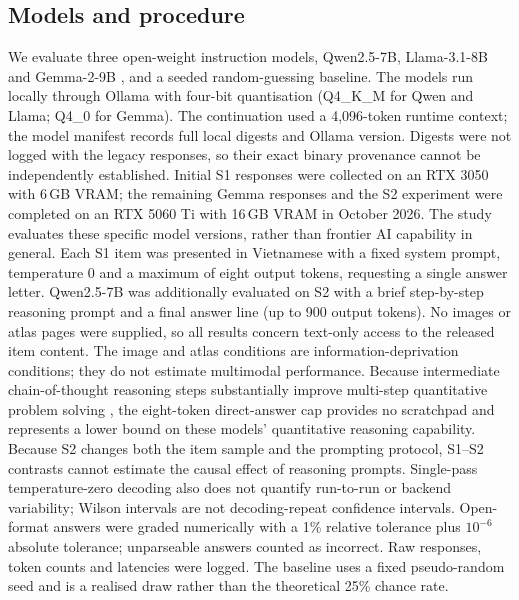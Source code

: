 \documentclass[preprint,12pt,authoryear,nonatbib]{elsarticle}
\begin{document}
\subsection{Models and procedure}
We evaluate three open-weight instruction models, Qwen2.5-7B, Llama-3.1-8B and Gemma-2-9B \citep{qwen2025,llama2024,gemma2024}, and a seeded random-guessing baseline. The models run locally through Ollama with four-bit quantisation (Q4\_K\_M for Qwen and Llama; Q4\_0 for Gemma). The continuation used a 4,096-token runtime context; the model manifest records full local digests and Ollama version. Digests were not logged with the legacy responses, so their exact binary provenance cannot be independently established. Initial S1 responses were collected on an RTX 3050 with 6\,GB VRAM; the remaining Gemma responses and the S2 experiment were completed on an RTX 5060 Ti with 16\,GB VRAM in October 2026. The study evaluates these specific model versions, rather than frontier AI capability in general. Each S1 item was presented in Vietnamese with a fixed system prompt, temperature 0 and a maximum of eight output tokens, requesting a single answer letter. Qwen2.5-7B was additionally evaluated on S2 with a brief step-by-step reasoning prompt and a final answer line (up to 900 output tokens). No images or atlas pages were supplied, so all results concern text-only access to the released item content. The image and atlas conditions are information-deprivation conditions; they do not estimate multimodal performance. Because intermediate chain-of-thought reasoning steps substantially improve multi-step quantitative problem solving \citep{wei2022cot}, the eight-token direct-answer cap provides no scratchpad and represents a lower bound on these models' quantitative reasoning capability. Because S2 changes both the item sample and the prompting protocol, S1--S2 contrasts cannot estimate the causal effect of reasoning prompts. Single-pass temperature-zero decoding also does not quantify run-to-run or backend variability; Wilson intervals are not decoding-repeat confidence intervals. Open-format answers were graded numerically with a 1\% relative tolerance plus $10^{-6}$ absolute tolerance; unparseable answers counted as incorrect. Raw responses, token counts and latencies were logged. The baseline uses a fixed pseudo-random seed and is a realised draw rather than the theoretical 25\% chance rate.
\end{document}

